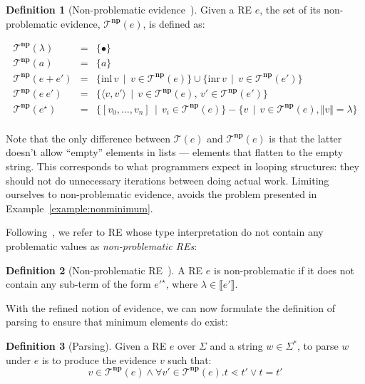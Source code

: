 \documentclass[oneside,12pt]{scrbook}
\theoremstyle{definition}
\newcommand{\sembrackets}[1]{\ensuremath{\llbracket #1 \rrbracket}}
\theoremstyle{plain}
\theoremstyle{definition}
\newtheorem{Definition}{Definition}
\begin{document}
\begin{Definition}[Non-problematic evidence~\cite{Frisch2004}]
   Given a RE $e$, the set of its non-problematic evidence, $\mathcal{T}^{\textbf{np}}(e)$, is defined as:

  \[
      \begin{array}{lcl}
         \mathcal{T}^{\textbf{np}}(\lambda)   & = & \{\bullet\} \\
         \mathcal{T}^{\textbf{np}}(a)         & = & \{a\} \\
         \mathcal{T}^{\textbf{np}}(e + e')    & = & \{\text{inl}\,v\,\mid\, v \in \mathcal{T}^{\textbf{np}}(e)\} \cup
                                      \{\text{inr}\,v\,\mid\, v \in \mathcal{T}^{\textbf{np}}(e')\} \\
         \mathcal{T}^{\textbf{np}}(e\:e')     & = & \{\langle v, v' \rangle \,\mid \, v \in \mathcal{T}^{\textbf{np}}(e),\, v' \in \mathcal{T}^{\textbf{np}}(e')\} \\
         \mathcal{T}^{\textbf{np}}(e^\star)   & = & \{[v_0,...,v_n]\,\mid\,v_i \in \mathcal{T}^{\textbf{np}}(e)\} -
                 \{v \,\mid\,v \in \mathcal{T}^{\textbf{np}}(e), \Vert v \Vert = \lambda\} \\
      \end{array}
  \]
\end{Definition}

Note that the only difference between $\mathcal{T}(e)$ and $\mathcal{T}^{\textbf{np}}(e)$ is that the latter
doesn't allow ``empty'' elements in lists --- elements that flatten to the empty string. This corresponds to
what programmers expect in looping structures: they should not do unnecessary iterations between doing actual
work. Limiting ourselves to non-problematic evidence, avoids the problem presented in Example~\ref{example:nonminimum}.

Following~\cite{Frisch2004}, we refer to RE whose type interpretation do not contain any problematic values as
\emph{non-problematic REs}:

\begin{Definition}[Non-problematic RE~\cite{Frisch2004}]
   A RE $e$ is non-problematic if it does not contain any sub-term of the form $e'^\star$, where
   $\lambda \in \sembrackets{e'}$.
\end{Definition}

With the refined notion of evidence, we can now formulate the definition of parsing to
ensure that minimum elements do exist:

\begin{Definition}[Parsing]
   Given a RE $e$ over $\Sigma$ and a string $w \in \Sigma^*$, to parse $w$ under $e$ is to
   produce the evidence $v$ such that:
   \[
       v \in \mathcal{T}^{\textbf{np}}(e) \land \forall v' \in \mathcal{T}^{\textbf{np}}(e). t \lessdot t' \lor t = t'
   \]
\end{Definition}
\end{document}
